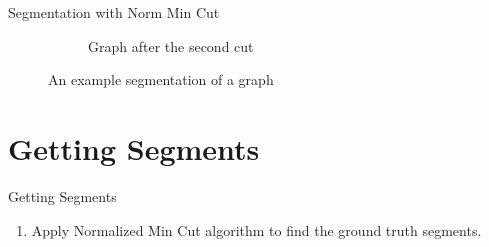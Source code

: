 \documentclass[10pt,xcolor=svgnames]{beamer} %
\begin{document}
\begin{frame}{Segmentation with Norm Min Cut}
\begin{figure}[ht!]
\begin{subfigure}{0.32\textwidth}
        \caption{Graph after the second cut}
        \end{subfigure}
    \caption{An example segmentation of a graph}
    \end{figure}
    
        
\end{frame}

\section{Getting Segments}

\begin{frame}{Getting Segments}
\begin{enumerate}
    \item Apply Normalized Min Cut algorithm to find the ground truth segments.
\end{enumerate}
\end{frame}
\end{document}
